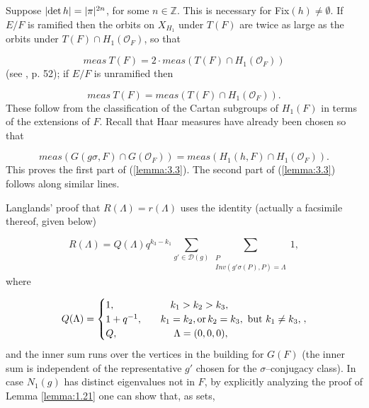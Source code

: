 \documentclass[12pt,letterpaper]{amsart}
\numberwithin{equation}{section}
\theoremstyle{definition}
\theoremstyle{plain}
\providecommand{\cal}{\mathcal}
\def\ddd{{\cal D}}
\def\zzz{\mathbb{Z}}
\def\off{{\cal O}_F}
\begin{document}
Suppose $|{\rm det }\, h| =|\pi |^{2n}$, for some $n\in\zzz$. This is 
necessary for Fix$(h)\not=\emptyset$. If $E/F$ is ramified then the
orbits on $X_{H_1}$ under $T(F)$ are twice as large as the orbits under
$T(F)\cap H_1(\off )$, so that

\begin{equation}
\label{eqn:3.13}
meas\ T(F) = 2\cdot meas(T(F)\cap H_1(\off ))
\end{equation}
(see \cite{La80b}, p. 52); if $E/F$ is unramified then

\begin{equation}
\label{eqn:3.14}
meas\ T(F)= meas(T(F)\cap H_1(\off )).
\end{equation}
These follow from the classification of the Cartan 
subgroups of $H_1(F)$ in terms
of the extensions of $F$. Recall that Haar measures have already been chosen 
so that 

\[
meas(G(g\sigma ,F)\cap G(\off ))=meas(H_1(h,F)\cap H_1(\off )).
\]
This proves the first part of (\ref{lemma:3.3}). 
The second part of (\ref{lemma:3.3}) follows along 
similar lines.
 
Langlands' proof that $R(\Lambda )=r(\Lambda )$ uses the identity (actually
a facsimile thereof, given below)

\begin{equation}
\label{eqn:3.15}
R(\Lambda )=Q(\Lambda )q^{k_3-k_1}\sum_{g'\in \ddd (g)}
\sum_{\substack{P\\Inv(g'\sigma (P),P)=\Lambda}} 1,
\end{equation}
where

\[
Q(\Lambda )=
\begin{cases} 1,&\ \ \ \ \ \ k_1>k_2>k_3,\\
1+q^{-1},&\ \ \ k_1=k_2, {\rm  or  }\, k_2=k_3,\ {\rm  but }\ k_1\not= k_3,\\
Q,&\ \ \ \ \ \ \ \Lambda = (0,0,0),
\end{cases} ,
\]
and the inner sum runs over the vertices in the building for
$G(F)$ (the inner sum is independent of the representative $g'$ chosen 
for the $\sigma$--conjugacy class). In case $N_1(g)$ has distinct
eigenvalues not in $F$, by explicitly analyzing the proof of Lemma 
\ref{lemma:1.21} one
can show that, as sets,
\end{document}
